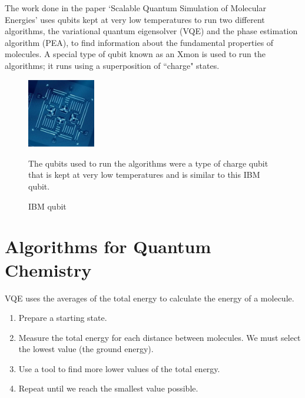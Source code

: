 \documentclass[14pt,landscape,color=UCLdarkred,margin=3cm]{uclposter}
\begin{document}
\begin{multicols}{3}
The work done in the paper `Scalable Quantum Simulation of Molecular Energies' uses qubits kept at very low temperatures to run two different algorithms, the variational quantum eigensolver (VQE) and the phase estimation algorithm (PEA),  to find information about the fundamental properties of molecules. A special type of qubit known as an Xmon is used to run the algorithms; it runs using a superposition of ``charge" states.
\\
\begin{figure}[H]
  \begin{center}
\setlength{\fboxsep}{0.5em}
  \begin{minipage}[c]{8em}
  \begin{center}
  \includegraphics[width=8em]{4_Qubit.png}
    \caption{IBM qubit}
  \end{center}
    
  \end{minipage}
  \qquad
  \begin{minipage}[c]{30em}
  \large

The qubits used to run the algorithms were a type of charge qubit that is kept at very low temperatures and is similar to this IBM qubit.

  \end{minipage}
  \end{center}

   
\end{figure}

\section*{Algorithms for Quantum Chemistry}

VQE uses the averages of the total energy to calculate the energy of a molecule.

\begin{highlightbox}
  \begin{enumerate}
\item Prepare a starting state. 
\item Measure the total energy for each distance between molecules. We must select the lowest value (the ground energy).
\item Use a tool to find more lower values of the total energy.
\item Repeat until we reach the smallest value possible.
\end{enumerate}
\end{highlightbox}


\end{multicols}
\end{document}
